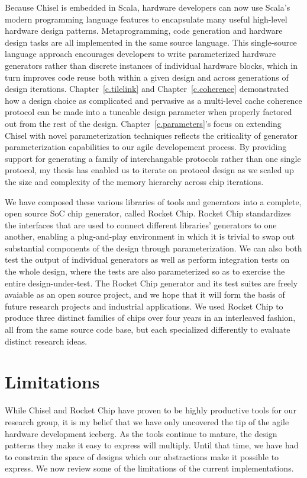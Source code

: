 Because Chisel is embedded in Scala, hardware developers can now use Scala's modern programming language features to encapsulate many useful high-level hardware design patterns.
Metaprogramming, code generation and hardware design tasks are all implemented in the same source language.
This single-source language approach encourages developers to write parameterized hardware generators rather than discrete instances of individual hardware blocks,
which in turn improves code reuse both within a given design and across generations of design iterations.
Chapter~\ref{c.tilelink} and Chapter~\ref{c.coherence} demonstrated how a design choice as complicated and pervasive as a multi-level cache coherence protocol can be made
into a tuneable design parameter when properly factored out from the rest of the design.
Chapter~\ref{c.parameters}'s focus on extending Chisel with novel parameterization techniques reflects the criticality of generator parameterization capabilities to our agile developement process.
By providing support for generating a family of interchangable protocols rather than one single protocol, my thesis has enabled us to iterate on protocol design as we scaled up the size and complexity of the memory hierarchy across chip iterations.

We have composed these various libraries of tools and generators into a complete, open source SoC chip generator, called Rocket Chip.
Rocket Chip  standardizes the interfaces that are used
to connect different libraries' generators to one another, enabling
a plug-and-play environment in which it is trivial to swap out
substantial components of the design through parameterization.
We can also both test the output of individual generators as well as perform
integration tests on the whole design, where the tests are also
parameterized so as to exercise the entire design-under-test.
The Rocket Chip generator and its test suites are freely avaiable as an open source project,
and we hope that it will form the basis of future research projects and industrial applications.
We used Rocket Chip to produce three distinct families of chips over four years in an interleaved fashion, 
all from the same source code base, but each specialized differently to evaluate distinct research ideas.

\section{Limitations}

While Chisel and Rocket Chip have proven to be highly productive tools for our research group,
it is my belief that we have only uncovered the tip of the agile hardware development iceberg.
As the tools continue to mature, the design patterns they make it easy to express will multiply.
Until that time, we have had to constrain the space of designs which our abstractions make it possible to express.
We now review some of the limitations of the current implementations.

